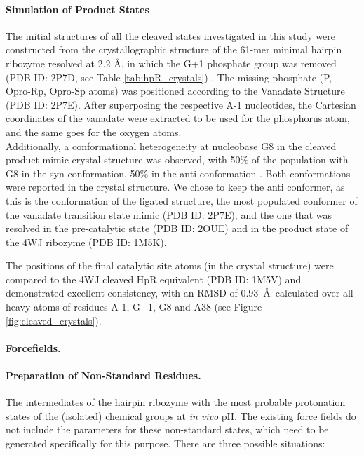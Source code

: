 \documentclass[journal=jacsat,manuscript=article]{achemso}
\begin{document}
\paragraph{Simulation of Product States}
The initial structures of all the cleaved states investigated in this study were constructed
from the crystallographic structure of the 61-mer minimal hairpin ribozyme resolved at 2.2 \AA,
in which the G+1 phosphate group was removed (PDB ID: 2P7D, see Table \ref{tab:hpR_crystals}) \cite{torelli_comparison_2007}.
The missing phosphate (P, Opro-Rp, Opro-Sp atoms) was positioned according to the Vanadate Structure (PDB ID: 2P7E).
After superposing the respective A-1 nucleotides, 
the Cartesian coordinates of the vanadate were extracted to be used for the phosphorus atom, and the same goes for the oxygen atoms.\\
Additionally, a conformational heterogeneity at nucleobase G8 in the cleaved product mimic crystal structure was observed, 
with 50\% of the population with G8 in the syn conformation, 50\% in the anti conformation \cite{torelli_comparison_2007}.
Both conformations were reported in the crystal structure. 
We chose to keep the anti conformer, as this is the conformation of the ligated structure, 
the most populated conformer of the vanadate transition state mimic (PDB ID: 2P7E), 
and the one that was resolved in the pre-catalytic state (PDB ID: 2OUE) and in the product state of the 4WJ ribozyme (PDB ID: 1M5K).

The positions of the final catalytic site atoms (in the crystal structure) were compared to the 4WJ cleaved HpR equivalent (PDB ID: 1M5V)
and demonstrated excellent consistency, with an RMSD of 0.93~\AA\ calculated over all heavy atoms of residues A-1, G+1, G8 and A38 (see Figure \ref{fig:cleaved_crystals}).


\paragraph{Forcefields.}

\paragraph{Preparation of Non-Standard Residues.}

The intermediates of the hairpin ribozyme with the most probable protonation states of the (isolated)
chemical groups at \textit{in vivo} pH.
The existing force fields do not include the parameters for these non-standard states, 
which need to be generated specifically for this purpose.
There are three possible situations:
\end{document}
